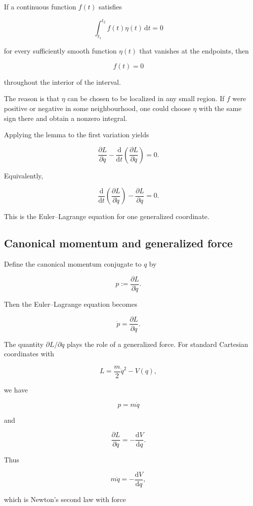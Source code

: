 If a continuous function \(f(t)\) satisfies

\[
\int_{t_{1}}^{t_{2}}
f(t)\eta(t)
\,\mathrm{d}t
=0
\]

for every sufficiently smooth function \(\eta(t)\) that vanishes at the endpoints, then

\[
f(t)=0
\]

throughout the interior of the interval.

The reason is that \(\eta\) can be chosen to be localized in any small region. If \(f\) were positive or negative in some neighbourhood, one could choose \(\eta\) with the same sign there and obtain a nonzero integral.

Applying the lemma to the first variation yields

\[
\frac{\partial L}{\partial q}
-
\frac{\mathrm{d}}{\mathrm{d}t}
\left(
\frac{\partial L}{\partial\dot q}
\right)
=0.
\]

Equivalently,

\[
\boxed{
\frac{\mathrm{d}}{\mathrm{d}t}
\left(
\frac{\partial L}{\partial\dot q}
\right)
-
\frac{\partial L}{\partial q}
=0
}.
\]

This is the Euler--Lagrange equation for one generalized coordinate.

\subsection{Canonical momentum and generalized force}

Define the canonical momentum conjugate to \(q\) by

\[
p
:=
\frac{\partial L}{\partial\dot q}.
\]

Then the Euler--Lagrange equation becomes

\[
\dot p
=
\frac{\partial L}{\partial q}.
\]

The quantity \(\partial L/\partial q\) plays the role of a generalized force. For standard Cartesian coordinates with

\[
L
=
\frac{m}{2}\dot q^{2}-V(q),
\]

we have

\[
p=m\dot q
\]

and

\[
\frac{\partial L}{\partial q}
=
-\frac{\mathrm{d}V}{\mathrm{d}q}.
\]

Thus

\[
m\ddot q
=
-\frac{\mathrm{d}V}{\mathrm{d}q},
\]

which is Newton's second law with force

